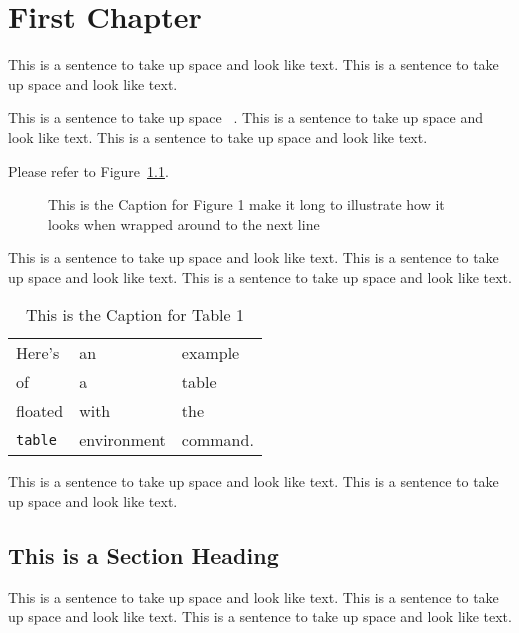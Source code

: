 
\chapter{First Chapter}

This is a sentence to take up space and look like text.
This is a sentence to take up space and look like text.

This is a sentence to take up space ~\cite{Hanninen}.
This is a sentence to take up space and look like text.
This is a sentence to take up space and look like text.

Please refer to Figure~\ref{myfig}.  %

\begin{figure}
\centering
\vspace{2.0in} %
\caption{This is the Caption for Figure 1 make it long to illustrate
how it looks when wrapped around to the next line}
\label{myfig}  %
\end{figure}

This is a sentence to take up space and look like text.
This is a sentence to take up space and look like text.
This is a sentence to take up space and look like text.

\begin{table}
\caption[This is the Caption for Table 1]
            {This is the Caption for Table 1}
\begin{center}
\begin{tabular}{lll}
Here's       & an          & example  \\
of           & a           & table    \\
floated      & with        & the      \\
\verb+table+ & environment & command.
\end{tabular}
\end{center}
\end{table}

This is a sentence to take up space and look like text.
This is a sentence to take up space and look like text.

\section{This is a Section Heading}

This is a sentence to take up space and look like text.
This is a sentence to take up space and look like text.
This is a sentence to take up space and look like text.
